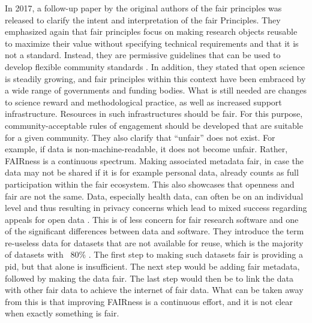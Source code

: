 In 2017, a follow-up paper \cite{mons_cloudy_2017} by the original authors of the \acrshort{fair} principles was released to clarify the intent and interpretation of the \acrshort{fair} Principles. They emphasized again that \acrshort{fair} principles focus on making research objects reusable to maximize their value without specifying technical requirements and that it is not a standard. Instead, they are permissive guidelines that can be used to develop flexible community standards \cite{boeckhout_fair_2018, mons_cloudy_2017}.
In addition, they stated that open science is steadily growing, and \acrshort{fair} principles within this context have been embraced by a wide range of governments and funding bodies. What is still needed are changes to science reward and methodological practice, as well as increased support infrastructure. Resources in such infrastructures should be \acrshort{fair}. For this purpose, community-acceptable rules of engagement should be developed that are suitable for a given community. They also clarify that “unfair” does not exist. For example, if data is non-machine-readable, it does not become unfair. Rather, FAIRness is a continuous spectrum. Making associated metadata \acrshort{fair}, in case the data may not be shared if it is for example personal data, already counts as full participation within the \acrshort{fair} ecosystem. This also showcases that openness and \acrshort{fair} are not the same. Data, especially health data, can often be on an individual level and thus resulting in privacy concerns which lead to mixed success regarding appeals for open data \cite{boeckhout_fair_2018, borgman_big_2015}. 
This is of less concern for \acrshort{fair} research software and one of the significant differences between data and software.
They introduce the term re-useless data for datasets that are not available for reuse, which is the majority of datasets with ~80\% \cite{mons_cloudy_2017}. The first step to making such datasets \acrshort{fair} is providing a \acrfull{pid}, but that alone is insufficient. The next step would be adding \acrshort{fair} metadata, followed by making the data \acrshort{fair}. The last step would then be to link the data with other \acrshort{fair} data to achieve the internet of \acrshort{fair} data. What can be taken away from this is that improving FAIRness is a continuous effort, and it is not clear when exactly something is \acrshort{fair}. 


